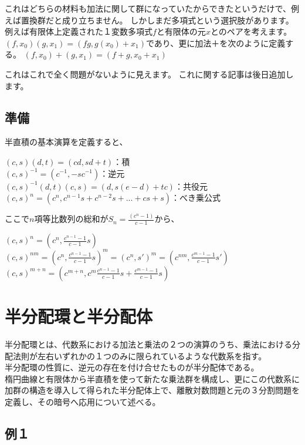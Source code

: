 \documentclass[
]{article}
\begin{document}
これはどちらの材料も加法に関して群になっていたからできたというだけで、例えば置換群だと成り立ちません。
しかしまだ多項式という選択肢があります。例えば有限体上定義された１変数多項式\(f\)と有限体の元\(x\)とのペアを考えます。
\((f,x_0)(g,x_1)=(fg,g(x_0)+x_1)\)であり、更に加法＋を次のように定義する。
\((f,x_0)+(g,x_1)=(f+g,x_0+x_1)\)

これはこれで全く問題がないように見えます。
これに関する記事は後日追加します。

\hypertarget{ux6e96ux5099}{%
\subsection{準備}\label{ux6e96ux5099}}

半直積の基本演算を定義すると、

\((c,s)(d,t)=(cd,sd+t)\)：積\\
\((c,s)^{-1}=(c^{-1},-sc^{-1})\)：逆元\\
\((c,s)^{-1}(d,t)(c,s)=(d,s(e-d)+tc)\)：共役元\\
\((c,s)^n=(c^n,c^{n-1}s+c^{n-2}s+...+cs+s)\)：べき乗公式

ここで\(n\)項等比数列の総和が\(S_n=\frac{(c^n-1)}{c-1}\)から、

\((c,s)^n=(c^n,\frac{c^{n-1}-1}{c-1}s)\)\\
\((c,s)^{nm}=(c^n,\frac{c^{n-1}-1}{c-1}s)^{m}=(c^{n},s')^m= (c^{nm},\frac{c^{m-1}-1}{c-1}s')\)\\
\((c,s)^{m+n}=(c^{m+n},c^m\frac{c^{n-1}-1}{c-1}s+\frac{c^{m-1}-1}{c-1}s)\)

\hypertarget{ux534aux5206ux914dux74b0ux3068ux534aux5206ux914dux4f53}{%
\section{半分配環と半分配体}\label{ux534aux5206ux914dux74b0ux3068ux534aux5206ux914dux4f53}}

半分配環とは、代数系における加法と乗法の２つの演算のうち、乗法における分配法則が左右いずれかの１つのみに限られているような代数系を指す。\\
半分配環の性質に、逆元の存在を付け合せたものが半分配体である。\\
楕円曲線と有限体から半直積を使って新たな乗法群を構成し、更にこの代数系に加群の構造を導入して得られた半分配体上で、離散対数問題と元の３分割問題を定義し、その暗号へ応用について述べる。

\hypertarget{ux4f8buxff11}{%
\subsection{例１}\label{ux4f8buxff11}}
\end{document}
